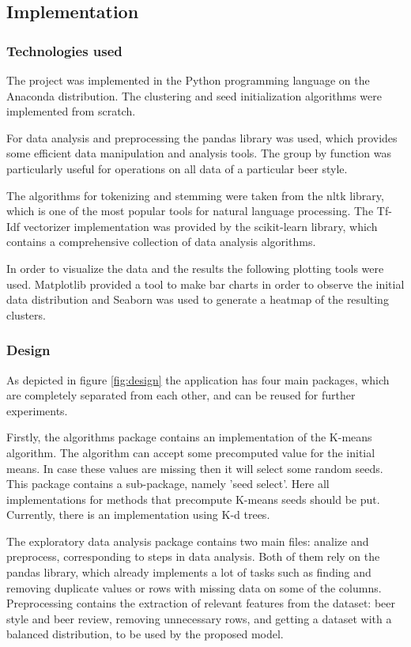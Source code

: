 \documentclass[12pt]{article}
\begin{document}
	\subsection{Implementation}
	\subsubsection{Technologies used}
	The project was implemented in the Python programming language on the Anaconda distribution. The clustering and seed initialization algorithms were implemented from scratch.
	
	For data analysis and preprocessing the pandas\cite{Pandas} library was used, which provides some efficient data manipulation and analysis tools. The group by function was particularly useful for operations on all data of a particular beer style. 
	
	The algorithms for tokenizing and stemming were taken from the nltk library\cite{NLTK}, which is one of the most popular tools for natural language processing. The Tf-Idf vectorizer implementation was provided by the scikit-learn library\cite{sk-learn}, which contains a comprehensive collection of data analysis algorithms.
	
	In order to visualize the data and the results the following plotting tools were used. Matplotlib\cite{Matplotlib} provided a tool to make bar charts in order to observe the initial data distribution and Seaborn\cite{Seaborn} was used to generate a heatmap of the resulting clusters.
	
	\subsubsection{Design}
	As depicted in figure \ref{fig:design} the application has four main packages, which are completely separated from each other, and can be reused for further experiments. 
	
	Firstly, the algorithms package contains an implementation of the K-means algorithm. The algorithm can accept some precomputed value for the initial means. In case these values are missing then it will select some random seeds. This package contains a sub-package, namely 'seed select'. Here all implementations for methods that precompute K-means seeds should be put. Currently, there is an implementation using K-d trees.
	
	The exploratory data analysis package contains two main files: analize and preprocess, corresponding to steps in data analysis. Both of them rely on the pandas library, which already implements a lot of tasks such as finding and removing duplicate values or rows with missing data on some of the columns. Preprocessing contains the extraction of relevant features from the dataset: beer style and beer review, removing unnecessary rows, and getting a dataset with a balanced distribution, to be used by the proposed model.
	
\end{document}
